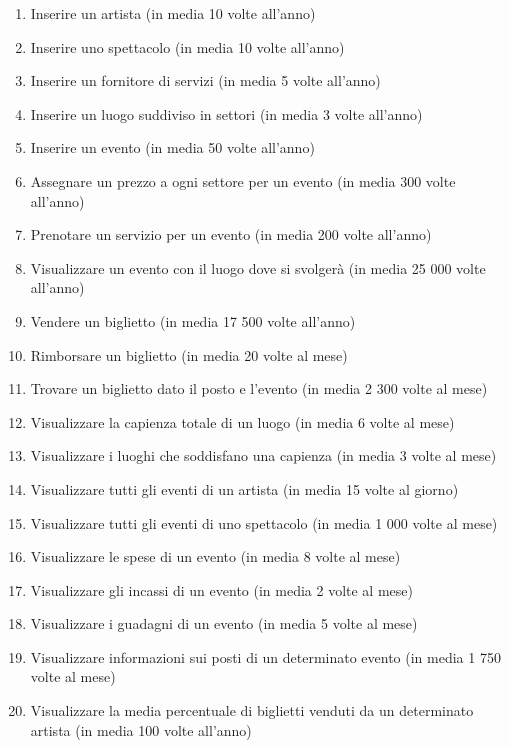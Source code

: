 \documentclass[a4paper,11pt]{article}
\begin{document}
\begin{enumerate}
    \item Inserire un artista (in media 10 volte all'anno)
    \item Inserire uno spettacolo (in media 10 volte all'anno)
    \item Inserire un fornitore di servizi (in media 5 volte all'anno)
    \item Inserire un luogo suddiviso in settori (in media 3 volte all'anno)
    \item \label{oploc1} Inserire un evento (in media 50 volte all'anno)
    \item \label{opsec1} Assegnare un prezzo a ogni settore per un evento (in media 300 volte all'anno)
    \item Prenotare un servizio per un evento (in media 200 volte all'anno)
    \item \label{oploc2} Visualizzare un evento con il luogo dove si svolgerà (in media 25 000 volte all'anno)
    \item Vendere un biglietto (in media 17 500 volte all'anno)
    \item Rimborsare un biglietto (in media 20 volte al mese)
    \item \label{search-ticket-by-seat} Trovare un biglietto dato il posto e l'evento (in media 2 300 volte al mese)
    \item \label{search-venue-capacity} Visualizzare la capienza totale di un luogo (in media 6 volte al mese)
    \item \label{search-venue-capacity-limit} Visualizzare i luoghi che soddisfano una capienza (in media 3 volte al mese)
    \item \label{oploc3} Visualizzare tutti gli eventi di un artista (in media 15 volte al giorno)
    \item \label{search-events-by-show} Visualizzare tutti gli eventi di uno spettacolo (in media 1 000 volte al mese)
    \item \label{oploc4} Visualizzare le spese di un evento (in media 8 volte al mese)
    \item \label{search-incoming-by-events} Visualizzare gli incassi di un evento (in media 2 volte al mese)
    \item \label{oploc5} Visualizzare i guadagni di un evento (in media 5 volte al mese)
    \item \label{search-info-by-event} Visualizzare informazioni sui posti di un determinato evento (in media 1 750 volte al mese)
    \item \label{mean-percentage-sold-tickets-by-artist} Visualizzare la media percentuale di biglietti venduti da un determinato artista (in media 100 volte all'anno)

\end{enumerate}
\end{document}
